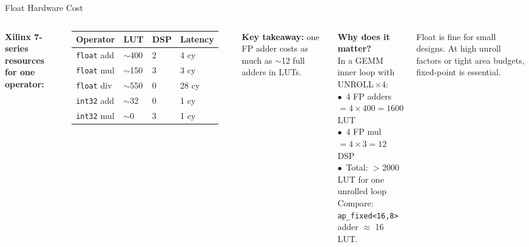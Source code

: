 \documentclass[aspectratio=169,12pt]{beamer}
\begin{document}
\begin{frame}{Float Hardware Cost}
\vspace{0.1cm}
\begin{columns}[T,totalwidth=\textwidth]


  {\small\color{Navy}\bfseries Xilinx 7-series resources for one operator:}
  \vspace{4pt}

  \begin{tabular}{lp{1.0cm}p{0.8cm}p{1.0cm}}
    \hline
    \rowcolor{Navy!10}\textbf{Operator} & \textbf{LUT} & \textbf{DSP} & \textbf{Latency}\\
    \hline
    \texttt{float} add  & $\sim$400 & 2 & 4 cy\\
    \rowcolor{Navy!5}\texttt{float} mul  & $\sim$150 & 3 & 3 cy\\
    \texttt{float} div  & $\sim$550 & 0 & 28 cy\\
    \rowcolor{Navy!5}\texttt{int32} add  & $\sim$32  & 0 & 1 cy\\
    \texttt{int32} mul  & $\sim$0   & 3 & 1 cy\\
    \hline
  \end{tabular}

  \vspace{8pt}
  {\small\color{Orange}\bfseries Key takeaway:} {\small one FP adder
  costs as much as $\sim$12 full adders in LUTs.}


  \vspace{0.1cm}

  \colorbox{Teal!10}{\parbox{\dimexpr\linewidth-2\fboxsep\relax}{\vspace{4pt}
    {\color{Teal}\bfseries Why does it matter?}\\[3pt]
    {\small In a GEMM inner loop with UNROLL\,$\times$4:}\\[2pt]
    {\small $\bullet$\ 4 FP adders $= 4 \times 400 = 1600$ LUT\\[1pt]
    $\bullet$\ 4 FP mul $= 4 \times 3 = 12$ DSP\\[1pt]
    $\bullet$\ Total: $>$2000 LUT for one unrolled loop}\\[3pt]
    {\small Compare: \texttt{ap\_fixed<16,8>} adder $\approx$ 16 LUT.}
  \vspace{4pt}}}

  \vspace{8pt}
  {\small\color{Navy}Float is fine for small designs.
  At high unroll factors or tight area budgets,
  fixed-point is essential.}

\end{columns}
\end{frame}
\end{document}
